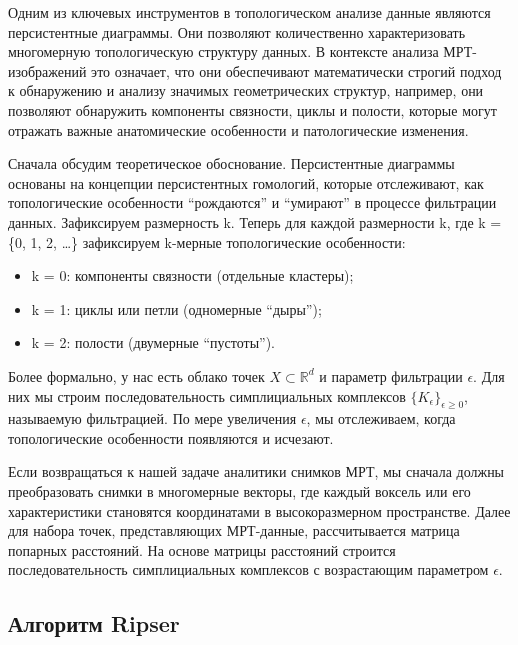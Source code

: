 \documentclass[a4paper,12pt]{extarticle}
\begin{document}
Одним из ключевых инструментов в топологическом анализе данные являются персистентные диаграммы. Они позволяют количественно характеризовать многомерную топологическую структуру данных. В контексте анализа МРТ-изображений это означает, что они обеспечивают математически строгий подход к обнаружению и анализу значимых геометрических структур, например, они позволяют обнаружить компоненты связности, циклы и полости, которые могут отражать важные анатомические особенности и патологические изменения. 

Сначала обсудим теоретическое обоснование. Персистентные диаграммы основаны на концепции персистентных гомологий, которые отслеживают, как топологические особенности ``рождаются'' и ``умирают'' в процессе фильтрации данных. Зафиксируем размерность k. Теперь для каждой размерности k, где k = \{0, 1, 2, \dots\} зафиксируем k-мерные топологические особенности:

\begin{itemize}
    \item k = 0: компоненты связности (отдельные кластеры);
    
    \item k = 1: циклы или петли (одномерные ``дыры'');
    
    \item k = 2: полости (двумерные ``пустоты'').
\end{itemize}

Более формально, у нас есть облако точек $X \subset \mathbb{R}^d$ и параметр фильтрации $\epsilon$. Для них мы строим последовательность симплициальных комплексов $\{K_\epsilon\}_{\epsilon \geq 0}$, называемую фильтрацией. По мере увеличения $\epsilon$, мы отслеживаем, когда топологические особенности появляются и исчезают.

Если возвращаться к нашей задаче аналитики снимков МРТ, мы сначала должны преобразовать снимки в многомерные векторы, где каждый воксель или его характеристики становятся координатами в высокоразмерном пространстве. Далее для набора точек, представляющих МРТ-данные, рассчитывается матрица попарных расстояний. На основе матрицы расстояний строится последовательность симплициальных комплексов с возрастающим параметром $\epsilon$. 

\subsection{Алгоритм Ripser}
\end{document}
